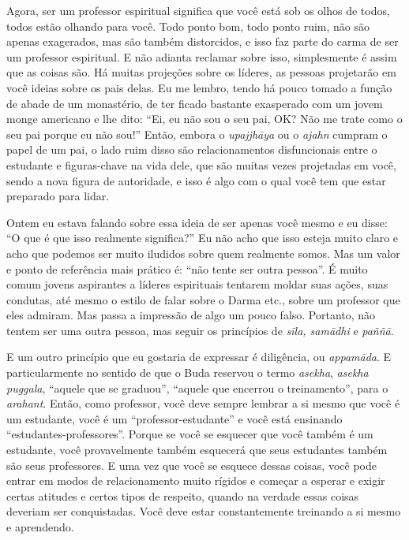 Agora, ser um professor espiritual significa que você está sob os
olhos de todos, todos estão olhando para você. Todo ponto bom, todo
ponto ruim, não são apenas exagerados, mas são também distorcidos, e
isso faz parte do carma de ser um professor espiritual. E não adianta
reclamar sobre isso, simplesmente é assim que as coisas são. Há muitas
projeções sobre os líderes, as pessoas projetarão em você ideias sobre
os pais delas. Eu me lembro, tendo há pouco tomado a função de abade de
um monastério, de ter ficado bastante exasperado com um jovem monge
americano e lhe dito: “Ei, eu não sou o seu pai, OK? Não me trate como
o seu pai porque eu não sou!” Então, embora o \textit{upajjhāya }ou o
\textit{ajahn }cumpram o papel de um pai, o lado ruim disso são
relacionamentos disfuncionais entre o estudante e figuras-chave na vida
dele, que são muitas vezes projetadas em você, sendo a nova figura de
autoridade, e isso é algo com o qual você tem que estar preparado para
lidar. 

Ontem eu estava falando sobre essa ideia de ser apenas você mesmo e
eu disse: “O que é que isso realmente significa?” Eu não acho que isso
esteja muito claro e acho que podemos ser muito iludidos sobre quem
realmente somos. Mas um valor e ponto de referência mais prático é:
“não tente ser outra pessoa”. É muito comum jovens aspirantes a líderes
espirituais tentarem moldar suas ações, suas condutas, até mesmo o
estilo de falar sobre o Darma etc., sobre um professor que eles
admiram. Mas passa a impressão de algo um pouco falso. Portanto, não
tentem ser uma outra pessoa, mas seguir os princípios de
\textit{sīla, samādhi }e \textit{paññā}. 

E um outro princípio que eu gostaria de expressar é diligência, ou
\textit{appamāda}. E particularmente no sentido de que o Buda
reservou o termo \textit{asekha}, \textit{asekha puggala}, “aquele que
se graduou”, “aquele que encerrou o treinamento”, para o
\textit{arahant}. Então, como professor, você deve sempre lembrar a si
mesmo que você é um estudante, você é um “professor-estudante” e você
está ensinando “estudantes-professores”. Porque se você se esquecer que
você também é um estudante, você provavelmente também esquecerá que
seus estudantes também são seus professores. E uma vez que você se
esquece dessas coisas, você pode entrar em modos de relacionamento
muito rígidos e começar a esperar e exigir certas atitudes e certos
tipos de respeito, quando na verdade essas coisas deveriam ser
conquistadas. Você deve estar constantemente treinando a si mesmo e
aprendendo. 

